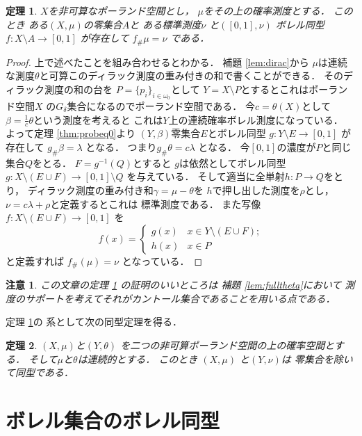 \documentclass[leqno, 12pt]{jsarticle}
\newtheorem{thm}{定理}
\newtheorem*{rmk}{注意}
\newcommand{\myomega}{\omega_{0}}
\newcommand{\myppp}[2]{#1_{\#}#2}
\begin{document}
\begin{thm}\label{thm:probeq}
$X$を非可算なポーランド空間とし，
$\mu$をその上の確率測度とする．
このとき
ある$(X, \mu)$の零集合$A$と
ある標準測度$\nu$
と$([0, 1], \nu)$
ボレル同型
$f\colon X\setminus A\to [0, 1]$
が存在して
$\myppp{f}{\mu}=\nu$
である．
\end{thm}
\begin{proof}
上で述べたことを組み合わせるとわかる．
補題 \ref{lem:dirac}から
$\mu$は連続な測度$\theta$と可算このディラック測度の重み付きの和で書くことができる．
そのディラック測度の和の台を
$P=\{p_{i}\}_{i\in \myomega}$として
$Y=X\setminus P$とするとこれはポーランド空間$X$
の$G_{\delta}$集合になるのでポーランド空間である．
今$c=\theta(X)$として
$\beta=\frac{1}{c}\theta$という測度を考えると
これは$Y$上の連続確率ボレル測度になっている．
よって定理 \ref{thm:probeq0}より
$(Y, \beta)$零集合$E$とボレル同型
$g\colon Y\setminus E\to [0, 1]$
が存在して
$\myppp{g}{\beta}=\lambda$
となる．
つまり$\myppp{g}{\theta}=c\lambda$
となる．
今$[0, 1]$の濃度が$P$と同じ集合$Q$をとる．
$F=g^{-1}(Q)$とすると
$g$は依然としてボレル同型
$g\colon X\setminus (E\cup F)\to [0, 1]\setminus Q$
を与えている．
そして適当に全単射$h\colon P\to Q$をとり，
ディラック測度の重み付き和$\gamma=\mu-\theta$を
$h$で押し出した測度を$\rho$とし，
$\nu=c\lambda+\rho$と定義するとこれは
標準測度である．
また写像$f\colon X\setminus (E\cup F)\to [0, 1]$
を
\[
f(x)=
\begin{cases}
g(x) & \text{$x\in Y\setminus (E\cup F)$;}\\
h(x) & \text{$x\in P$}
\end{cases}
\]
と定義すれば
$\myppp{f}(\mu)=\nu$
となっている．
\end{proof}
\begin{rmk}
この文章の定理 
\ref{thm:probeq}
の証明のいいところは
補題
\ref{lem:fulltheta}において
測度のサポートを考えてそれがカントール集合であることを用いる点である．
\end{rmk}

定理 \ref{thm:probeq}の
系として次の同型定理を得る．
\begin{thm}\label{thm:probeqX}
$(X, \mu)$と$(Y, \theta)$
を二つの非可算ポーランド空間の上の確率空間とする．
そして$\mu$と$\theta$は連続的とする．
このとき
$(X, \mu)$
と$(Y, \nu)$は
零集合を除いて同型である．
\end{thm}

	
	
\section{ボレル集合のボレル同型}\label{sec:b3}
\end{document}
